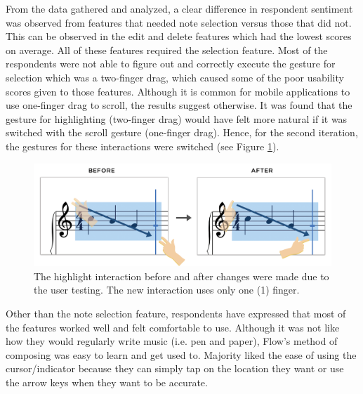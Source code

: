 			From the data gathered and analyzed, a clear difference in respondent sentiment was observed from features that needed note selection versus those that did not. This can be observed in the edit and delete features which had the lowest scores on average. All of these features required the selection feature. Most of the respondents were not able to figure out and correctly execute the gesture for selection which was a two-finger drag, which caused some of the poor usability scores given to those features. Although it is common for mobile applications to use one-finger drag to scroll, the results suggest otherwise. It was found that the gesture for highlighting (two-finger drag) would have felt more natural if it was switched with the scroll gesture (one-finger drag). Hence, for the second iteration, the gestures for these interactions were switched (see Figure \ref{fig:highlight}).

			\begin{figure}[h]
				\centering
				\includegraphics[scale=0.25]{figures/before-after-highlight.png}
			    \caption{The highlight interaction before and after changes were made due to the user testing. The new interaction uses only one (1) finger.}
			    \label{fig:highlight}
			\end{figure}

			Other than the note selection feature, respondents have expressed that most of the features worked well and felt comfortable to use. Although it was not like how they would regularly write music (i.e. pen and paper), Flow's method of composing was easy to learn and get used to. Majority liked the ease of using the cursor/indicator because they can simply tap on the location they want or use the arrow keys when they want to be accurate.

